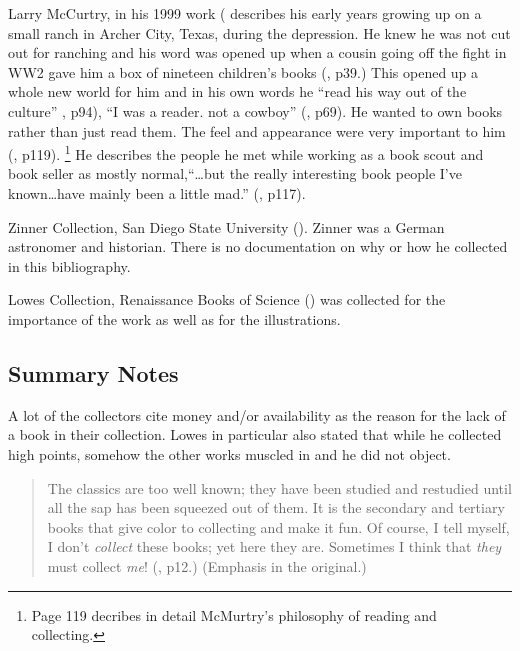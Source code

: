 \documentclass[letterpaper]{article}
\begin{document}
Larry McCurtry, in his 1999 work  (\cite{McMurtry1999} describes his early years growing up on
a small ranch in Archer City, Texas, during the depression.  He knew
he was not cut out for ranching and his word was opened up when a
cousin going off the fight in WW2 gave him a box of nineteen
children's books (\cite{McMurtry1999}, p39.) This opened up a whole
new world for him and in his own words he ``read his way out of the
culture'' \cite{McMurtry1999}, p94), ``I was a reader. not a cowboy''
(\cite{McMurtry1999}, p69). He wanted to own books rather than just
read them. The feel and appearance were very important to him
(\cite{McMurtry1999}, p119). \footnote{Page 119 decribes in detail
  McMurtry's philosophy of reading and collecting.}  He describes the
people he met while working as a book scout and book seller as mostly
normal,``\ldots but the really interesting book people I've
known\ldots have mainly been a little mad.'' (\cite{McMurtry1999},
p117).




Zinner Collection, San Diego State University
(\cite{Kenny1988}). Zinner was a German astronomer and historian.
There is no documentation on why or how he collected in this
bibliography.

Lowes Collection, Renaissance Books of Science (\cite{Godine1970})
was collected for the importance of the work as well as for the
illustrations.

\subsection{Summary Notes}

A lot of the collectors cite money and/or availability as the reason
for the lack of a book in their collection.  Lowes in particular also
stated that while he collected high points, somehow the other works
muscled in and he did not object.

\begin{quotation}
The classics are too well known; they have been studied and restudied
until all the sap has been squeezed out of them. It is the secondary
and tertiary books that give color to collecting and make it fun.  Of
course, I tell myself, I don't {\itshape collect} these books; yet
here they are. Sometimes I think that {\itshape they} must collect
{\itshape me}\thinspace! (\cite{Godine1970}, p12.) (Emphasis in the
original.)
\end{quotation}

\printbibliography
\end{document}
